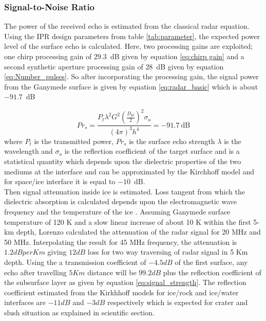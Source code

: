 \subsubsection{Signal-to-Noise Ratio}

The power of the received echo is estimated from the classical radar equation. Using the \ac{IPR} design parameters from table \ref{tab:parameter}, the expected power level of the surface echo is calculated. Here, two processing gains are exploited; one chirp processing gain of $29.3$~dB given by equation \ref{eq:chirp gain} and a second synthetic aperture processing gain of $28$~dB given by equation \ref{eq:Number_pulses}. So after incorporating the processing gain, the signal power from the Ganymede surface is given by equation \ref{eq:radar_basic} which is about $-91.7$~dB

\begin{equation}
Pr_{s} = \dfrac{P_{t}\lambda^{2}G^{2}(\frac{D_{pl}}{2})^{2}\sigma_{o}}{(4\pi)^{3}h^{4}} 
	  = -91.7 \mathrm{~dB} 
\label{eq:radar_basic}
\end{equation}
where $P_{t}$ is the transmitted power, $Pr_{s}$ is the surface echo strength $\lambda$ is the wavelength  and $\sigma_{o}$ is the reflection coefficient of the target surface and is a statistical quantity which depends upon the dielectric properties of the two mediums at the interface and can be approximated by the Kirchhoff model \cite{MIMOSA} and for space/ice interface it is equal to $-10$~dB.\\
%

Then signal attenuation inside ice is estimated. Loss tangent from which the dielectric absorption is calculated depends upon the electromagnetic wave frequency and the temperature of the ice \cite{MIMOSA}. Assuming Ganymede surface temperature of 120 K and a slow linear increase of about 10 K within the first 5-km depth, Lorenzo \cite{Gany_SRS} calculated the attenuation of the radar signal for 20 MHz and 50 MHz. Interpolating the result for 45 MHz frequency, the attenuation is $1.2 dB per Km$ giving $12 dB$ loss for two way traversing of radar signal in 5 Km depth. Using the a transmission coefficient of $-4.5 dB$ of the first surface, any echo after travelling $5 Km $ distance will be $99.2 dB$ plus the reflection coefficient of the subsurface layer as given by equation \ref{eq:signal_strength}. The reflection coefficient estimated from the Kirkhhoff models for ice/rock and ice/water interfaces are $-11 dB$ and $-3 dB$ respectively which is expected for  crater and slush situation as explained in scientific section.

